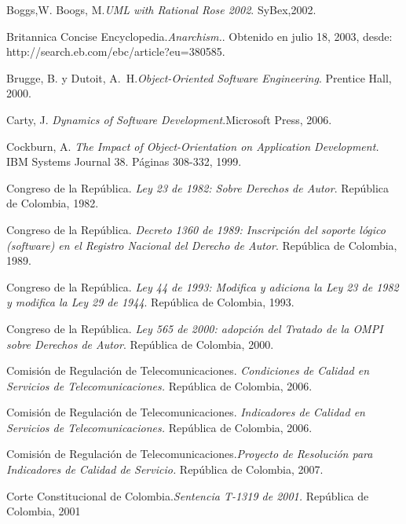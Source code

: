 \begin{thebibliography}{}
 Boggs,W. Boogs, M.\textit{UML with Rational Rose 2002}. SyBex,2002.

 Britannica Concise Encyclopedia.\textit{Anarchism.}. Obtenido en julio 18, 2003, desde:    http://search.eb.com/ebc/article?eu=380585.

 Brugge, B. y Dutoit, A.~H.\textit{Object-Oriented Software Engineering}. Prentice Hall, 2000.

 Carty, J. \textit{Dynamics of Software Development}.Microsoft Press, 2006.

 Cockburn, A. \textit{The Impact of Object-Orientation on Application Development.} IBM Systems Journal 38. Páginas 308-332, 1999.

 Congreso de la República. \textit{Ley 23 de 1982: Sobre Derechos de Autor}. República de Colombia, 1982.

 Congreso de la República. \textit{Decreto 1360 de 1989: Inscripción del soporte lógico (software) en el Registro Nacional del Derecho de Autor}. República de Colombia, 1989.

 Congreso de la República. \textit{Ley 44 de 1993: Modifica y adiciona la Ley 23 de 1982 y modifica la Ley 29 de 1944}. República de Colombia, 1993.

 Congreso de la República. \textit{Ley 565 de 2000: adopción del Tratado de la OMPI sobre Derechos de Autor}. República de Colombia, 2000.

 Comisión de Regulación de Telecomunicaciones. \textit{Condiciones de Calidad en Servicios de Telecomunicaciones.} República de Colombia, 2006. 

 Comisión de Regulación de Telecomunicaciones. \textit{Indicadores de Calidad en Servicios de Telecomunicaciones.} República de Colombia, 2006. 

 Comisión de Regulación de Telecomunicaciones.\textit{Proyecto de Resolución para Indicadores de Calidad de Servicio.} República de Colombia, 2007.

 Corte Constitucional de Colombia.\textit{Sentencia T-1319 de 2001.} República de Colombia, 2001


\end{thebibliography}
